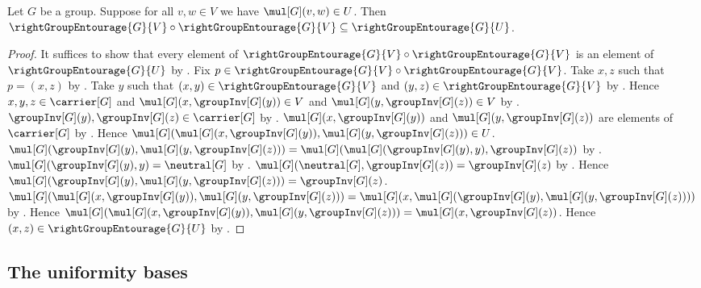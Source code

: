 \begin{proposition}\label{right_group_entourage_square}
    Let $G$ be a group.
    Suppose for all $v,w\in V$ we have $\mul[G](v,w)\in U$.
    Then $\rightGroupEntourage{G}{V}
        \circ\rightGroupEntourage{G}{V}
        \subseteq\rightGroupEntourage{G}{U}$.
\end{proposition}
\begin{proof}
    It suffices to show that every element of
        $\rightGroupEntourage{G}{V}\circ\rightGroupEntourage{G}{V}$
        is an element of $\rightGroupEntourage{G}{U}$ by .
    Fix $p\in
        \rightGroupEntourage{G}{V}\circ\rightGroupEntourage{G}{V}$.
    Take $x,z$ such that $p=(x,z)$ by .
    Take $y$ such that
        $(x,y)\in\rightGroupEntourage{G}{V}$ and
        $(y,z)\in\rightGroupEntourage{G}{V}$ by .
    Hence $x,y,z\in\carrier[G]$ and
        $\mul[G](x,\groupInv[G](y))\in V$ and
        $\mul[G](y,\groupInv[G](z))\in V$
        by .
    $\groupInv[G](y),\groupInv[G](z)\in\carrier[G]$
        by .
    $\mul[G](x,\groupInv[G](y))$ and
        $\mul[G](y,\groupInv[G](z))$ are elements of $\carrier[G]$
        by .
    Hence
        $\mul[G](\mul[G](x,\groupInv[G](y)),
            \mul[G](y,\groupInv[G](z)))\in U$.
    $\mul[G](\groupInv[G](y),\mul[G](y,\groupInv[G](z)))
        =\mul[G](\mul[G](\groupInv[G](y),y),\groupInv[G](z))$
        by .
    $\mul[G](\groupInv[G](y),y)=\neutral[G]$
        by .
    $\mul[G](\neutral[G],\groupInv[G](z))=\groupInv[G](z)$
        by .
    Hence
        $\mul[G](\groupInv[G](y),\mul[G](y,\groupInv[G](z)))
            =\groupInv[G](z)$.
    $\mul[G](\mul[G](x,\groupInv[G](y)),
            \mul[G](y,\groupInv[G](z)))
        =\mul[G](x,
            \mul[G](\groupInv[G](y),
                \mul[G](y,\groupInv[G](z))))$
        by .
    Hence $\mul[G](\mul[G](x,\groupInv[G](y)),
            \mul[G](y,\groupInv[G](z)))
        =\mul[G](x,\groupInv[G](z))$.
    Hence $(x,z)\in\rightGroupEntourage{G}{U}$
        by .
\end{proof}

\subsection{The uniformity bases}

